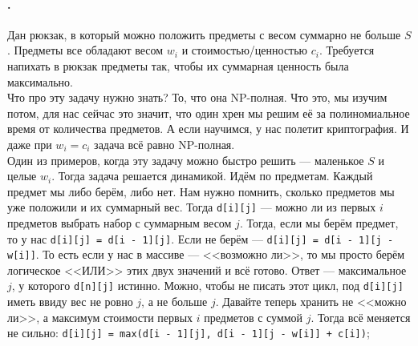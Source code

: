 \documentclass{article}
\newcommand{\pseudo}{PseudoLexer.py:PseudoLexer -x}
\newcommand{\pseudocode}[1]{\texttt{#1}}
\begin{document}
    \paragraph{.}
    Дан рюкзак, в который можно положить предметы с весом суммарно не больше $S$. Предметы все обладают весом $w_i$ и стоимостью/ценностью $c_i$. Требуется напихать в рюкзак предметы так, чтобы их суммарная ценность была максимально.\\
    Что про эту задачу нужно знать? То, что она NP-полная. Что это, мы изучим потом, для нас сейчас это значит, что один хрен мы решим её за полиномиальное время от количества предметов. А если научимся, у нас полетит криптография. И даже при $w_i=c_i$ задача всё равно NP-полная.\\
    Один из примеров, когда эту задачу можно быстро решить --- маленькое $S$ и целые $w_i$. Тогда задача решается динамикой. Идём по предметам. Каждый предмет мы либо берём, либо нет. Нам нужно помнить, сколько предметов мы уже положили и их суммарный вес. Тогда \pseudocode{d[i][j]} --- можно ли из первых $i$ предметов выбрать набор с суммарным весом $j$. Тогда, если мы берём предмет, то у нас \pseudocode{d[i][j] = d[i - 1][j]}. Если не берём --- \pseudocode{d[i][j] = d[i - 1][j - w[i]]}. То есть если у нас в массиве --- <<возможно ли>>, то мы просто берём логическое <<ИЛИ>> этих двух значений и всё готово. Ответ --- максимальное $j$, у которого \pseudocode{d[n][j]} истинно. Можно, чтобы не писать этот цикл, под \pseudocode{d[i][j]} иметь ввиду вес не ровно $j$, а не больше $j$. Давайте теперь хранить не <<можно ли>>, а максимум стоимости первых $i$ предметов с суммой $j$. Тогда всё меняется не сильно: \pseudocode{d[i][j] = max(d[i - 1][j], d[i - 1][j - w[i]]  + c[i])};\\
\end{document}
